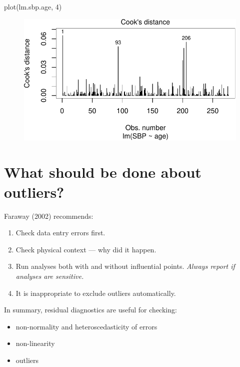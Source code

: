 \documentclass[
  letterpaper,
  DIV=11,
  numbers=noendperiod]{scrreport}
\newenvironment{Shaded}{\begin{snugshade}}{\end{snugshade}}
\newcommand{\DecValTok}[1]{\textcolor[rgb]{0.68,0.00,0.00}{#1}}
\newcommand{\FunctionTok}[1]{\textcolor[rgb]{0.28,0.35,0.67}{#1}}
\newcommand{\NormalTok}[1]{\textcolor[rgb]{0.00,0.23,0.31}{#1}}
\providecommand{\tightlist}{%
  \setlength{\itemsep}{0pt}\setlength{\parskip}{0pt}}\usepackage{longtable,booktabs,array}
\begin{document}
\begin{Shaded}
\begin{Highlighting}[]
\FunctionTok{plot}\NormalTok{(lm.sbp.age, }\DecValTok{4}\NormalTok{)}
\end{Highlighting}
\end{Shaded}

\begin{figure}[H]

{\centering \includegraphics{week4/week4_files/figure-pdf/unnamed-chunk-15-1.pdf}

}

\end{figure}

\hypertarget{what-should-be-done-about-outliers}{%
\section{What should be done about
outliers?}\label{what-should-be-done-about-outliers}}

Faraway (2002) recommends:

\begin{enumerate}
\def\labelenumi{\arabic{enumi}.}
\tightlist
\item
  Check data entry errors first.
\item
  Check physical context --- why did it happen.
\item
  Run analyses both with and without influential points. \emph{Always
  report if analyses are sensitive.}
\item
  It is inappropriate to exclude outliers automatically.
\end{enumerate}

In summary, residual diagnostics are useful for checking:

\begin{itemize}
\tightlist
\item
  non-normality and heteroscedasticity of errors
\item
  non-linearity
\item
  outliers
\end{itemize}
\end{document}
